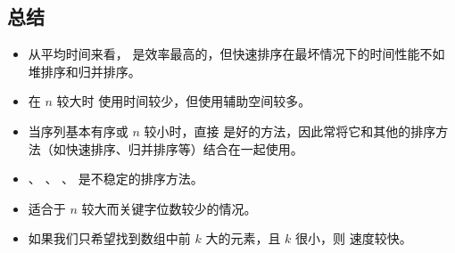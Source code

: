 \documentclass[letterpaper,10pt,english]{sphinxmanual}
\begin{document}
\begin{DUlineblock}{0em}
\item[] 
\end{DUlineblock}


\subsection{总结}
\label{\detokenize{mathematicsAlgorithm/07_sort:id12}}\begin{itemize}
\item {} 
从平均时间来看， 是效率最高的，但快速排序在最坏情况下的时间性能不如堆排序和归并排序。

\item {} 
在 \(n\) 较大时  使用时间较少，但使用辅助空间较多。

\item {} 
当序列基本有序或 \(n\) 较小时，直接  是好的方法，因此常将它和其他的排序方法（如快速排序、归并排序等）结合在一起使用。

\item {} 
 、  、  、  是不稳定的排序方法。

\item {} 
 适合于 \(n\) 较大而关键字位数较少的情况。

\item {} 
如果我们只希望找到数组中前 \(k\) 大的元素，且 \(k\) 很小，则  速度较快。

\end{itemize}
\end{document}

